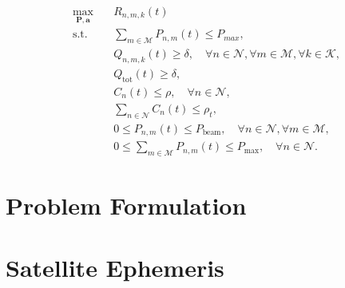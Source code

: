 \begin{align*}
\max_{\mathbf{P}, \mathbf{a}} \quad & R_{n,m,k}(t) \\
\text{s.t.} \quad & \sum_{m \in \mathcal{M}} P_{n,m}(t) \leq P_{max}, \\
& Q_{n,m,k}(t) \geq \delta, \quad \forall n \in \mathcal{N}, \forall m \in \mathcal{M}, \forall k \in \mathcal{K}, \\
& Q_{\text{tot}}(t) \geq \delta, \\
& C_n(t) \leq \rho, \quad \forall n \in \mathcal{N}, \\
& \sum_{n \in \mathcal{N}} C_n(t) \leq \rho_t, \\
& 0 \leq P_{n,m}(t) \leq P_{\text{beam}}, \quad \forall n \in \mathcal{N}, \forall m \in \mathcal{M}, \\
& 0 \leq \sum_{m \in \mathcal{M}} P_{n,m}(t) \leq P_{\text{max}}, \quad \forall n \in \mathcal{N}.
\end{align*}

\section{Problem Formulation}

\section{Satellite Ephemeris}
